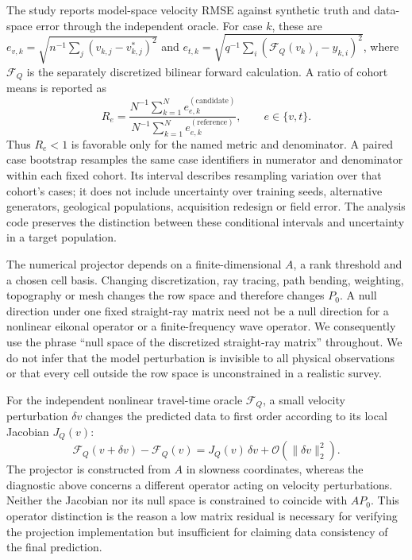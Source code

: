 \documentclass[11pt]{article}
\begin{document}
The study reports model-space velocity RMSE against synthetic truth and data-space error through the independent oracle. For case $k$, these are $e_{v,k}=\sqrt{n^{-1}\sum_j(v_{k,j}-v^*_{k,j})^2}$ and $e_{t,k}=\sqrt{q^{-1}\sum_i(\mathcal{F}_{Q}(v_k)_i-y_{k,i})^2}$, where $\mathcal{F}_{Q}$ is the separately discretized bilinear forward calculation. A ratio of cohort means is reported as
\begin{equation}\label{eq:ratio-of-means}
R_e=\frac{N^{-1}\sum_{k=1}^{N}e_{e,k}^{(\mathrm{candidate})}}{N^{-1}\sum_{k=1}^{N}e_{e,k}^{(\mathrm{reference})}},\qquad e\in\{v,t\}.
\end{equation}
Thus $R_e<1$ is favorable only for the named metric and denominator. A paired case bootstrap resamples the same case identifiers in numerator and denominator within each fixed cohort. Its interval describes resampling variation over that cohort's cases; it does not include uncertainty over training seeds, alternative generators, geological populations, acquisition redesign or field error. The analysis code preserves the distinction between these conditional intervals and uncertainty in a target population.

The numerical projector depends on a finite-dimensional $A$, a rank threshold and a chosen cell basis. Changing discretization, ray tracing, path bending, weighting, topography or mesh changes the row space and therefore changes $P_0$. A null direction under one fixed straight-ray matrix need not be a null direction for a nonlinear eikonal operator or a finite-frequency wave operator. We consequently use the phrase “null space of the discretized straight-ray matrix” throughout. We do not infer that the model perturbation is invisible to all physical observations or that every cell outside the row space is unconstrained in a realistic survey.

For the independent nonlinear travel-time oracle $\mathcal{F}_{Q}$, a small velocity perturbation $\delta v$ changes the predicted data to first order according to its local Jacobian $J_Q(v)$:
\begin{equation}\label{eq:oracle-linearization}
\mathcal{F}_{Q}(v+\delta v)-\mathcal{F}_{Q}(v)=J_Q(v)\,\delta v+\mathcal{O}(\|\delta v\|_2^2).
\end{equation}
The projector is constructed from $A$ in slowness coordinates, whereas the diagnostic above concerns a different operator acting on velocity perturbations. Neither the Jacobian nor its null space is constrained to coincide with $A P_0$. This operator distinction is the reason a low matrix residual is necessary for verifying the projection implementation but insufficient for claiming data consistency of the final prediction.
\end{document}
